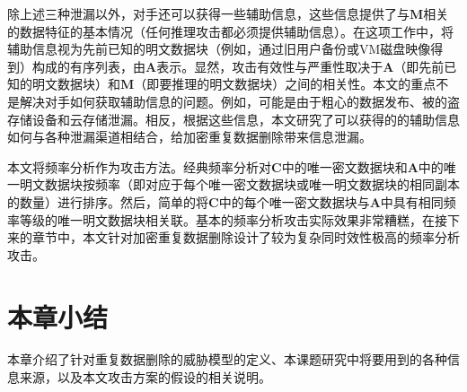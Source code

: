 除上述三种泄漏以外，对手还可以获得一些辅助信息，这些信息提供了与$\mathbf{M}$相关的数据特征的基本情况（任何推理攻击都必须提供辅助信息）。在这项工作中，将辅助信息视为先前已知的明文数据块（例如，通过旧用户备份或VM磁盘映像得到）构成的有序列表，由$\mathbf{A}$表示。显然，攻击有效性与严重性取决于$\mathbf{A}$（即先前已知的明文数据块）和$\mathbf{M}$（即要推理的明文数据块）之间的相关性。本文的重点不是解决对手如何获取辅助信息的问题。例如，可能是由于粗心的数据发布、被的盗存储设备和云存储泄漏。相反，根据这些信息，本文研究了可以获得的的辅助信息如何与各种泄漏渠道相结合，给加密重复数据删除带来信息泄漏。

本文将频率分析作为攻击方法。经典频率分析对$\mathbf{C}$中的唯一密文数据块和$\mathbf{A}$中的唯一明文数据块按频率（即对应于每个唯一密文数据块或唯一明文数据块的相同副本的数量）进行排序。然后，简单的将$\mathbf{C}$中的每个唯一密文数据块与$\mathbf{A}$中具有相同频率等级的唯一明文数据块相关联。基本的频率分析攻击实际效果非常糟糕，在接下来的章节中，本文针对加密重复数据删除设计了较为复杂同时效性极高的频率分析攻击。

\section{本章小结}

本章介绍了针对重复数据删除的威胁模型的定义、本课题研究中将要用到的各种信息来源，以及本文攻击方案的假设的相关说明。





